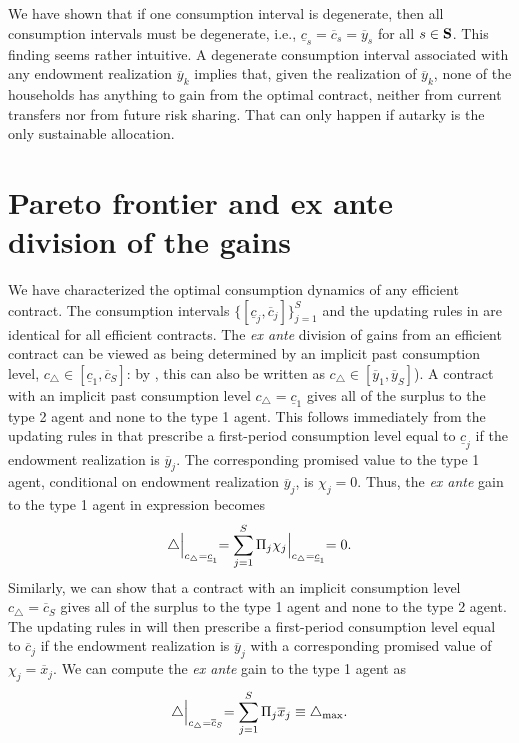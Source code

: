 We have shown that if one consumption interval is degenerate, then
all consumption intervals must be degenerate, i.e., $\underline
c_s = \overline c_s = \overline y_s$ for all $s\in {\bf S}$. This
finding seems rather intuitive. A degenerate consumption interval
associated with any endowment realization $\overline y_k$ implies
that, given the realization of $\overline y_k$, none of the
households has anything to gain from the optimal contract,
neither from current transfers nor from future risk sharing. That
can only happen if autarky is the only sustainable allocation.



\section{Pareto frontier and ex ante division of the gains}\label{sec:Koch_Pareto1}%
We have characterized the optimal consumption dynamics of any
efficient contract. The consumption intervals $\{[\underline c_j,
\overline c_j]\}_{j=1}^S$ and the updating rules in 
are identical for all efficient contracts. The {\it ex ante}
division of  gains from an efficient contract can be viewed as
being determined by an implicit past consumption level,
$c_{\triangle}\in[\underline c_1, \overline c_S]$: by
, this can also be written as
$c_{\triangle}\in[\overline y_1, \overline y_S]$). A contract with
an implicit past consumption level $c_{\triangle}=\underline c_1$ gives
all of the surplus to the type 2 agent and none to the type 1
agent. This follows immediately from the updating rules in
 that prescribe a first-period consumption level
equal to $\underline c_j$ if the endowment realization is
$\overline y_j$. The corresponding promised value to the type 1
agent, conditional on endowment realization $\overline y_j$, is
$\chi_j = 0$. Thus, the {\it ex ante} gain to the type 1 agent in
expression  becomes
$$
\triangle \Bigl|_{c_{\triangle}=\underline c_1}
   = \sum_{j=1}^S \Pi_j \chi_j \Bigl|_{c_{\triangle}=\underline c_1}= 0.
$$
Similarly, we can  show that a contract with an implicit consumption
level $c_{\triangle}=\overline c_S$ gives all of the surplus to
the type 1 agent and none to the type 2 agent. The updating rules
in  will then prescribe a first-period consumption
level equal to $\overline c_j$ if the endowment realization is
$\overline y_j$ with a corresponding promised value of $\chi_j =
\overline x_j$. We can compute the {\it ex ante} gain to the type
1 agent as
$$
\triangle \Bigl|_{c_{\triangle}=\overline c_S}
          = \sum_{j=1}^S \Pi_j \overline x_j \equiv \triangle_{\rm max}.
$$


